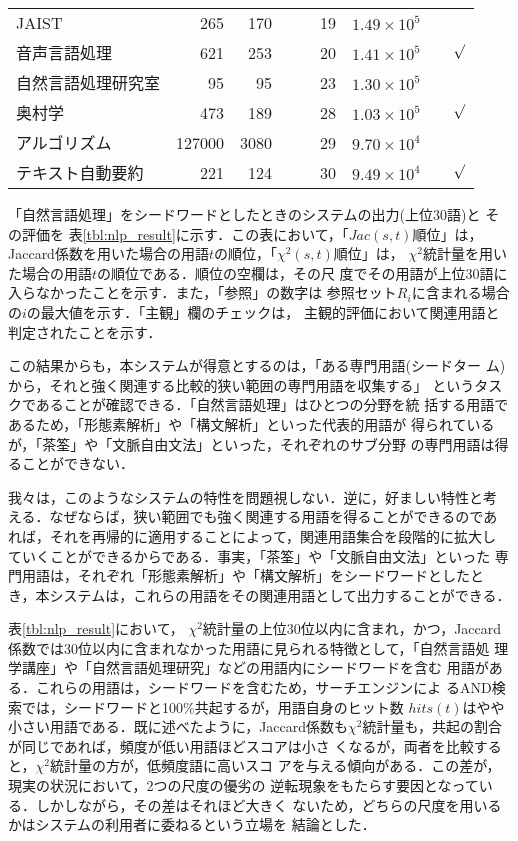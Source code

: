 \begin{table}
\begin{center}
\begin{tabular}{|l|rr|rr|rr|cc|}
   JAIST & 265 & 170 &  &  & 19 & $1.49\times 10^5$  &  & \\
   音声言語処理 & 621 & 253 &  &  & 20 & $1.41\times 10^5$  &  & $\surd$\\
   自然言語処理研究室 & 95 & 95 &  &  & 23 & $1.30\times 10^5$  &  & \\
   奥村学 & 473 & 189 &  &  & 28 & $1.03\times 10^5$  &  & $\surd$\\
   アルゴリズム & 127000 & 3080 &  &  & 29 & $9.70\times 10^4$  &  & \\
   テキスト自動要約 & 221 & 124 &  &  & 30 & $9.49\times 10^4$  &  & $\surd$\\
   \hline
  \end{tabular}
 \end{center}
\end{table}

「自然言語処理」をシードワードとしたときのシステムの出力(上位30語)と
その評価を
\mbox{表\ref{tbl:nlp_result}}に示す．この表において，「$Jac(s,t)$順位」は，
Jaccard係数を用いた場合の用語$t$の順位，「$\chi ^2(s,t)$順位」は，
$\chi ^2$統計量を用いた場合の用語$t$の順位である．順位の空欄は，その尺
度でその用語が上位30語に入らなかったことを示す．また，「参照」の数字は
参照セット$R_i$に含まれる場合の$i$の最大値を示す．「主観」欄のチェックは，
主観的評価において関連用語と判定されたことを示す．

この結果からも，本システムが得意とするのは，「ある専門用語(シードター
ム)から，それと強く関連する比較的狭い範囲の専門用語を収集する」
というタスクであることが確認できる．「自然言語処理」はひとつの分野を統
括する用語であるため，「形態素解析」や「構文解析」といった代表的用語が
得られているが，「茶筌」や「文脈自由文法」といった，それぞれのサブ分野
の専門用語は得ることができない．

我々は，このようなシステムの特性を問題視しない．逆に，好ましい特性と考
える．なぜならば，狭い範囲でも強く関連する用語を得ることができるのであ
れば，それを再帰的に適用することによって，関連用語集合を段階的に拡大し
ていくことができるからである．事実，「茶筌」や「文脈自由文法」といった
専門用語は，それぞれ「形態素解析」や「構文解析」をシードワードとしたと
き，本システムは，これらの用語をその関連用語として出力することができる．

\mbox{表\ref{tbl:nlp_result}}において，
$\chi ^2$統計量の上位30位以内に含まれ，かつ，Jaccard 
係数では30位以内に含まれなかった用語に見られる特徴として，「自然言語処
理学講座」や「自然言語処理研究」などの用語内にシードワードを含む
用語がある．これらの用語は，シードワードを含むため，サーチエンジンによ
るAND検索では，シードワードと100\%共起するが，用語自身のヒット数
$hits(t)$はやや小さい用語である．既に述べたように，Jaccard係数も$\chi
^2$統計量も，共起の割合が同じであれば，頻度が低い用語ほどスコアは小さ
くなるが，両者を比較すると，$\chi ^2$統計量の方が，低頻度語に高いスコ
アを与える傾向がある．この差が，現実の状況において，2つの尺度の優劣の
逆転現象をもたらす要因となっている．しかしながら，その差はそれほど大きく
ないため，どちらの尺度を用いるかはシステムの利用者に委ねるという立場を
結論とした．

